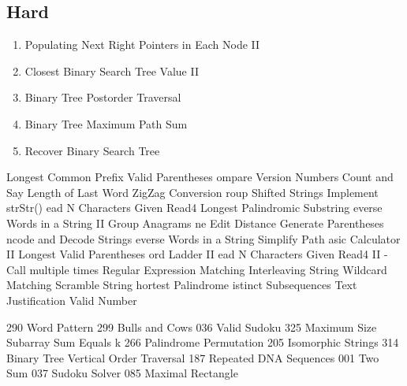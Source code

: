 \documentclass[DIV=calc, paper=a4, fontsize=11pt, twocolumn]{scrartcl}	 %
\begin{document}
\subsection*{Hard}
\begin{enumerate}
\item Populating Next Right Pointers in Each Node II \cite{117}
\item Closest Binary Search Tree Value II    \cite{272}
\item Binary Tree Postorder Traversal \cite{145}
\item Binary Tree Maximum Path Sum   \cite{124}
\item  Recover Binary Search Tree  \cite{099}
\end{enumerate}


Longest Common Prefix \cite{014} 
Valid Parentheses   \cite{020}
ompare Version Numbers \cite{165}
Count and Say  \cite{038}
Length of Last Word \cite{058}
 ZigZag Conversion \cite{006}
roup Shifted Strings \cite{249}
Implement strStr()  \cite{028}
ead N Characters Given Read4 \cite{157}
 Longest Palindromic Substring \cite{005}
everse Words in a String II  \cite{186}
Group Anagrams  \cite{049}
ne Edit Distance \cite{161}
Generate Parentheses  \cite{022}
ncode and Decode Strings \cite{271}
everse Words in a String \cite{151}
Simplify Path   \cite{071}
asic Calculator II \cite{227}
Longest Valid Parentheses \cite{032}
ord Ladder II  \cite{126}
ead N Characters Given Read4 II - Call multiple times \cite{158}
Regular Expression Matching  \cite{010}
Interleaving String  \cite{097}
Wildcard Matching  \cite{044}
Scramble String  \cite{087}
hortest Palindrome  \cite{214}
istinct Subsequences  \cite{115}
Text Justification \cite{068}
Valid Number   \cite{065}

290 Word Pattern 
299 Bulls and Cows
036  Valid Sudoku
325 Maximum Size Subarray Sum Equals k
266 Palindrome Permutation 
205 Isomorphic Strings 
314 Binary Tree Vertical Order Traversal 
187 Repeated DNA Sequences 
001   Two Sum 
037  Sudoku Solver
085  Maximal Rectangle

{}

\end{document}
